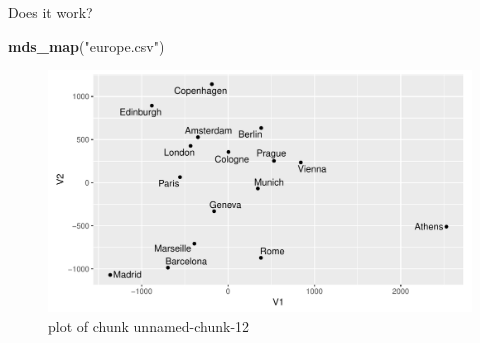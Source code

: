\documentclass[ignorenonframetext,]{beamer}
\newenvironment{Shaded}{\begin{snugshade}}{\end{snugshade}}
\newcommand{\KeywordTok}[1]{\textcolor[rgb]{0.13,0.29,0.53}{\textbf{#1}}}
\newcommand{\NormalTok}[1]{#1}
\newcommand{\StringTok}[1]{\textcolor[rgb]{0.31,0.60,0.02}{#1}}
\begin{document}
\begin{frame}[fragile]{Does it work?}
\protect\hypertarget{does-it-work}{}

\begin{Shaded}
\begin{Highlighting}[]
\KeywordTok{mds_map}\NormalTok{(}\StringTok{"europe.csv"}\NormalTok{)}
\end{Highlighting}
\end{Shaded}

\begin{figure}
\centering
\includegraphics{figure/unnamed-chunk-12-1.pdf}
\caption{plot of chunk unnamed-chunk-12}
\end{figure}

\end{frame}
\end{document}

